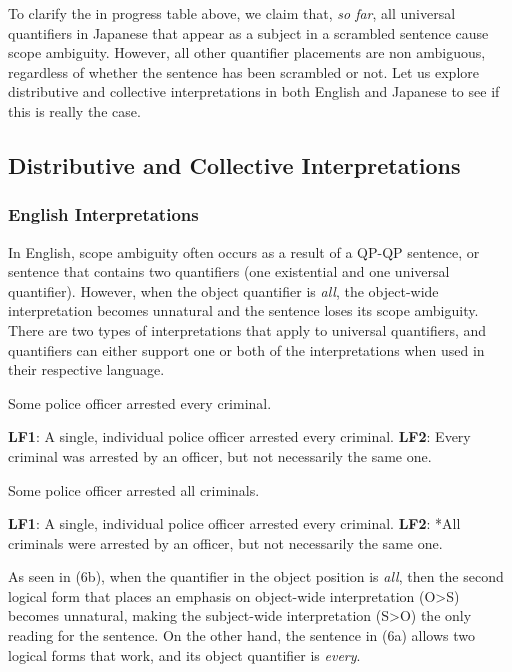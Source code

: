 \documentclass[english, 11pt]{article}
\begin{document}
\newline
To clarify the in progress table above, we claim that, \emph{so far}, all universal quantifiers in Japanese that appear as a subject in a scrambled sentence cause scope ambiguity. However, all other quantifier placements are non ambiguous, regardless of whether the sentence has been scrambled or not. Let us explore distributive and collective interpretations in both English and Japanese to see if this is really the case.

\subsection{Distributive and Collective Interpretations}
\subsubsection{English Interpretations}
In English, scope ambiguity often occurs as a result of a QP-QP sentence, or sentence that contains two quantifiers (one existential and one universal quantifier). However, when the object quantifier is \emph{all}, the object-wide interpretation becomes unnatural and the sentence loses its scope ambiguity. There are two types of interpretations that apply to universal quantifiers, and quantifiers can either support one or both of the interpretations when used in their respective language.
\begin {exe}
	\ex 
		\begin {xlist}
			\ex Some police officer arrested every criminal.
			\begin {xlist} 
				\ex \textbf{LF1}: A single, individual police officer arrested every criminal.
				\ex \textbf{LF2}: Every criminal was arrested by an officer, but not necessarily the same one.
			\end {xlist}
			\ex Some police officer arrested all criminals.
				\begin {xlist} 
					\ex \textbf{LF1}: A single, individual police officer arrested every criminal.
					\ex \textbf{LF2}: *All criminals were arrested by an officer, but not necessarily the same one.
				\end {xlist}
	\end {xlist}
\end {exe}
As seen in (6b), when the quantifier in the object position is \emph{all}, then the second logical form that places an emphasis on object-wide interpretation (O>S) becomes unnatural, making the subject-wide interpretation (S>O) the only reading for the sentence. On the other hand, the sentence in (6a) allows two logical forms that work, and its object quantifier is \emph{every}. 
\end{document}
